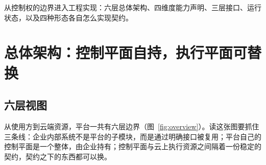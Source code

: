 {从控制权的边界进入工程实现：六层总体架构、四维度能力声明、三层接口、运行状态，以及四种形态各自怎么实现契约。}

\section{总体架构：控制平面自持，执行平面可替换}
\label{sec:overview}

\subsection{六层视图}

从使用方到云端资源，平台一共有六层边界（图~\ref{fig:overview}）。读这张图要抓住三条线：企业内部系统不是平台的子模块，而是通过明确接口被复用；平台自己的控制平面是一个整体，由企业持有；控制平面与云上执行资源之间隔着一份稳定的契约，契约之下的东西都可以换。

